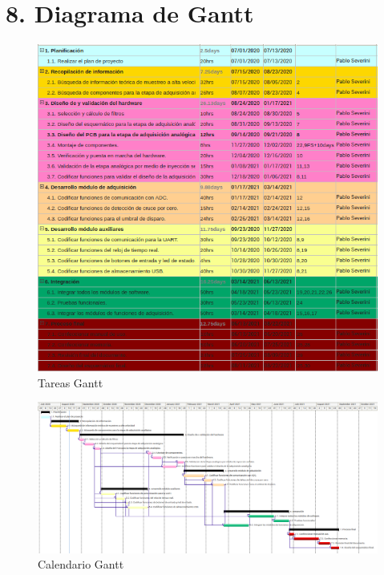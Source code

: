 \documentclass[11pt]{charter}
\begin{document}
\section{8. Diagrama de Gantt}
\label{sec:gantt}

\begin{figure}[htpb]
\centering 
\includegraphics[width=1\textwidth]{./Figuras/tablaGant.png}
\caption{Tareas Gantt}
\label{fig:AoN}
\end{figure}

\begin{landscape}
\begin{figure}[htpb]
\centering 
\includegraphics[width=1.6\textwidth]{./Figuras/calendarioGant.png}
\caption{Calendario Gantt}
\label{fig:AoN}
\end{figure}
\end{landscape}
\end{document}

